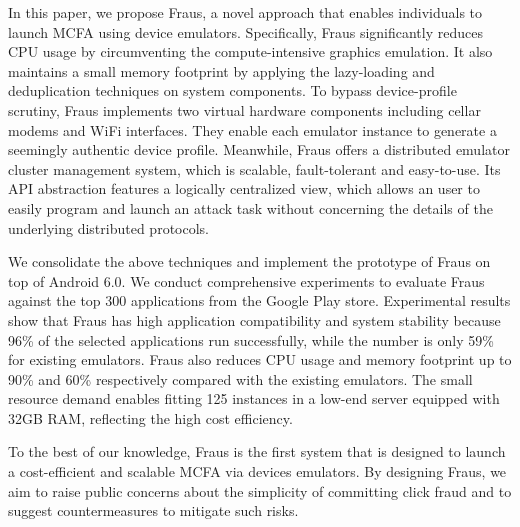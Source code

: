 \documentclass[conference]{IEEEtranl}
\begin{document}
	In this paper, we propose Fraus, a novel approach that enables individuals to launch MCFA using device emulators. Specifically, Fraus significantly reduces CPU usage by circumventing the compute-intensive graphics emulation. It also maintains a small memory footprint by applying the lazy-loading and deduplication techniques on system components. To bypass device-profile scrutiny, Fraus implements two virtual hardware components including cellar modems and WiFi interfaces. They enable each emulator instance to generate a seemingly authentic device profile. Meanwhile, Fraus offers a distributed emulator cluster management system, which is scalable, fault-tolerant and easy-to-use. Its API abstraction features a logically centralized view, which allows an user to easily program and launch an attack task without concerning the details of the underlying distributed protocols.

	We consolidate the above techniques and implement the prototype of Fraus on top of Android 6.0. We conduct comprehensive experiments to evaluate Fraus against the top 300 applications from the Google Play store. Experimental results show that Fraus has high application compatibility and system stability because 96\% of the selected applications run successfully, while the number is only 59\% for existing emulators. Fraus also reduces CPU usage and memory footprint up to 90\% and 60\% respectively compared with the existing emulators. The small resource demand enables fitting 125 instances in a low-end server equipped with 32GB RAM, reflecting the high cost efficiency.

	To the best of our knowledge, Fraus is the first system that is designed to launch a cost-efficient and scalable MCFA via devices emulators. By designing Fraus, we aim to raise public concerns about the simplicity of committing click fraud and to suggest countermeasures to mitigate such risks.

\end{document}
